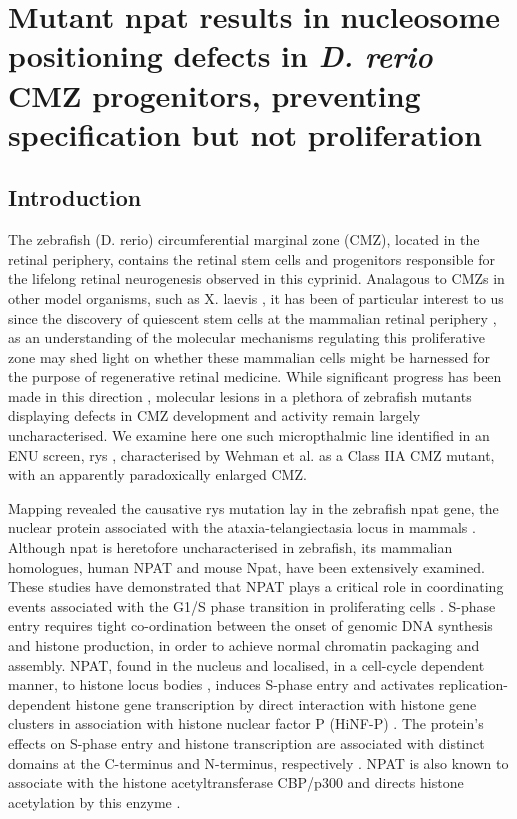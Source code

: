 \chapter{Mutant npat results in nucleosome positioning defects in \textit{D. rerio} CMZ progenitors, preventing specification but not proliferation}
\label{chap:rys}
\section{Introduction}
The zebrafish (D. rerio) circumferential marginal zone (CMZ), located in the retinal periphery, contains the retinal stem cells and progenitors responsible for the lifelong retinal neurogenesis observed in this cyprinid. Analagous to CMZs in other model organisms, such as X. laevis \cite{Perron1998}, it has been of particular interest to us since the discovery of quiescent stem cells at the mammalian retinal periphery \cite{Tropepe2000}, as an understanding of the molecular mechanisms regulating this proliferative zone may shed light on whether these mammalian cells might be harnessed for the purpose of regenerative retinal medicine. While significant progress has been made in this direction \cite{Raymond2006}, molecular lesions in a plethora of zebrafish mutants displaying defects in CMZ development and activity remain largely uncharacterised. We examine here one such micropthalmic line identified in an ENU screen, rys \cite{Wehman2005}, characterised by Wehman et al. as a Class IIA CMZ mutant, with an apparently paradoxically enlarged CMZ.

Mapping revealed the causative rys mutation lay in the zebrafish npat gene, the nuclear protein associated with the ataxia-telangiectasia locus in mammals \cite{Imai1996}. Although npat is heretofore uncharacterised in zebrafish, its mammalian homologues, human NPAT and mouse Npat, have been extensively examined. These studies have demonstrated that NPAT plays a critical role in coordinating events associated with the G1/S phase transition in proliferating cells \cite{Ye2003}. S-phase entry requires tight co-ordination between the onset of genomic DNA synthesis and histone production, in order to achieve normal chromatin packaging and assembly. NPAT, found in the nucleus \cite{Sagara2002} and localised, in a cell-cycle dependent manner, to histone locus bodies \cite{Ghule2009}, induces S-phase entry \cite{Zhao1998} and activates replication-dependent histone gene transcription by direct interaction with histone gene clusters \cite{Zhao2000} in association with histone nuclear factor P (HiNF-P) \cite{Mitra2003}. The protein’s effects on S-phase entry and histone transcription are associated with distinct domains at the C-terminus and N-terminus, respectively \cite{Wei2003}. NPAT is also known to associate with the histone acetyltransferase CBP/p300 \cite{Wang2004} and directs histone acetylation by this enzyme \cite{He2011}.

